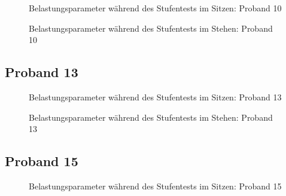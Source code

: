 \documentclass[
  letterpaper,
  DIV=11]{scrartcl}
\begin{document}
\begin{figure}


\caption{\label{fig-ST1_10}Belastungsparameter während des Stufentests
im Sitzen: Proband 10}

\end{figure}%

\begin{figure}


\caption{\label{fig-ST2_10}Belastungsparameter während des Stufentests
im Stehen: Proband 10}

\end{figure}%

\subsection{Proband 13}

\begin{figure}


\caption{\label{fig-ST1_13}Belastungsparameter während des Stufentests
im Sitzen: Proband 13}

\end{figure}%

\begin{figure}


\caption{\label{fig-ST2_13}Belastungsparameter während des Stufentests
im Stehen: Proband 13}

\end{figure}%

\subsection{Proband 15}

\begin{figure}


\caption{\label{fig-ST1_15}Belastungsparameter während des Stufentests
im Sitzen: Proband 15}

\end{figure}%
\end{document}
